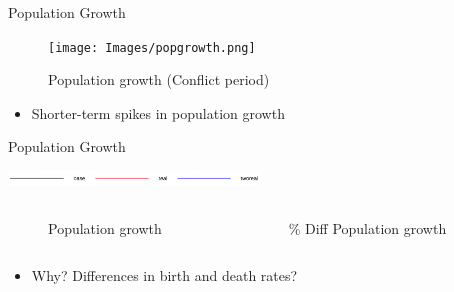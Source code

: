 \documentclass{beamer}
\begin{document}
		\begin{frame}{Population Growth}
			\begin{center}
				\begin{figure}
					\texttt{[image: Images/popgrowth.png]}
					\caption{Population growth (Conflict period)}
				\end{figure}
			\end{center} 	

			\begin{itemize}
				\item Shorter-term spikes in population growth
			\end{itemize}
			
		\end{frame}

		\begin{frame}{Population Growth}
			\begin{center}
				\includegraphics[width=0.5\textwidth]{Images/legend.png}
			\end{center}

			\begin{columns}
				\begin{column}{0.5\paperwidth}
					\begin{figure}
						\caption{Population growth}
					\end{figure}
				\end{column}

				\begin{column}{0.5\paperwidth}
					\begin{figure}
						\caption{\% Diff Population growth}
					\end{figure}
				\end{column}
			\end{columns}	

			\begin{itemize}
				\item Why? Differences in birth and death rates?
			\end{itemize}

		\end{frame}
\end{document}
